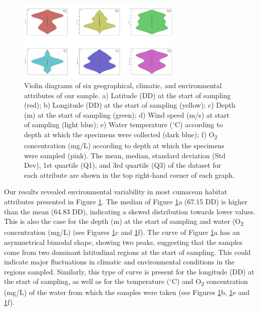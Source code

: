 \begin{figure}[htbp]
    \centering
    \includegraphics[width=0.7\textwidth]{figure1.jpg}
    \caption{Violin diagrams of six geographical, climatic, and environmental attributes of our sample. a) Latitude (DD) at the start of sampling (red); b) Longitude (DD) at the start of sampling (yellow); c) Depth (m) at the start of sampling (green); d) Wind speed (m/s) at start of sampling (light blue); e) Water temperature ($^\circ$C) according to depth at which the specimens were collected (dark blue); f) O\textsubscript{2} concentration (mg/L) according to depth at which the specimens were sampled (pink). The mean, median, standard deviation (Std Dev), 1st quartile (Q1), and 3rd quartile (Q3) of the dataset for each attribute are shown in the top right-hand corner of each graph. \label{fig:fig2}}
\end{figure}

Our results revealed environmental variability in most cumacean habitat attributes presented in Figure \ref{fig:fig2}. The median of Figure \ref{fig:fig2}a (67.15 DD) is higher than the mean (64.83 DD), indicating a skewed distribution towards lower values. This is also the case for the depth (m) at the start of sampling and water (O\textsubscript{2} concentration (mg/L) (see Figures \ref{fig:fig2}c and \ref{fig:fig2}f). The curve of Figure \ref{fig:fig2}a has an asymmetrical bimodal shape, showing two peaks, suggesting that the samples come from two dominant latitudinal regions at the start of sampling. This could indicate major fluctuations in climatic and environmental conditions in the regions sampled. Similarly, this type of curve is present for the longitude (DD) at the start of sampling, as well as for the temperature ($^\circ$C) and O\textsubscript{2} concentration (mg/L) of the water from which the samples were taken (see Figures \ref{fig:fig2}b, \ref{fig:fig2}e and \ref{fig:fig2}f). 

